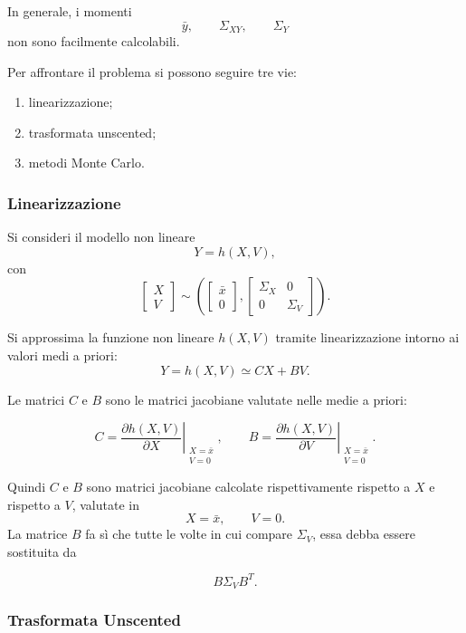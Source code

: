 \documentclass[11pt,a4paper]{article}
\begin{document}
In generale, i momenti
\[
\bar y,\qquad \Sigma_{XY},\qquad \Sigma_Y
\]
non sono facilmente calcolabili.

Per affrontare il problema si possono seguire tre vie:
\begin{enumerate}
    \item linearizzazione;
    \item trasformata unscented;
    \item metodi Monte Carlo.
\end{enumerate}

\subsubsection*{Linearizzazione}

Si consideri il modello non lineare
\[
Y=h(X,V),
\]
con
\[
\begin{bmatrix}
X\\
V
\end{bmatrix}
\sim
\left(
\begin{bmatrix}
\bar x\\
0
\end{bmatrix},
\begin{bmatrix}
\Sigma_X & 0\\
0 & \Sigma_V
\end{bmatrix}
\right).
\]

Si approssima la funzione non lineare \(h(X,V)\) tramite linearizzazione intorno ai valori medi a priori:
\[
Y=h(X,V)\simeq CX+BV.
\]

Le matrici \(C\) e \(B\) sono le matrici jacobiane valutate nelle medie a priori:

\[
C
=
\left.
\frac{\partial h(X,V)}{\partial X}
\right|_{\substack{X=\bar x\\ V=0}},
\qquad
B
=
\left.
\frac{\partial h(X,V)}{\partial V}
\right|_{\substack{X=\bar x\\ V=0}}.
\]

Quindi \(C\) e \(B\) sono matrici jacobiane calcolate rispettivamente rispetto a \(X\) e rispetto a \(V\), valutate in
\[
X=\bar x,
\qquad
V=0.
\]
La matrice \(B\) fa sì che tutte le volte in cui compare \(\Sigma_V\),
essa debba essere sostituita da

\[
B\Sigma_VB^T.
\]

\subsubsection*{Trasformata Unscented}
\end{document}
